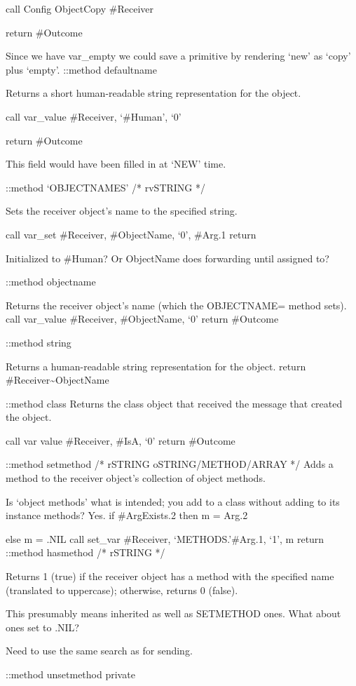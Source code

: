 call Config ObjectCopy \#Receiver

return \#Outcome

Since we have var\_empty we could save a primitive by rendering `new' as
`copy' plus `empty'. ::method defaultname

Returns a short human-readable string representation for the object.

call var\_value \#Receiver, `\#Human', `0'

return \#Outcome

This field would have been filled in at `NEW' time.

::method `OBJECTNAMES' /* rvSTRING */

Sets the receiver object's name to the specified string.

call var\_set \#Receiver, \#ObjectName, `0', \#Arg.1 return

Initialized to \#Human? Or ObjectName does forwarding until assigned to?

::method objectname

Returns the receiver object's name (which the OBJECTNAME= method sets).
call var\_value \#Receiver, \#ObjectName, `0' return \#Outcome

::method string

Returns a human-readable string representation for the object. return
\#Receiver\textasciitilde ObjectName

::method class Returns the class object that received the message that
created the object.

call var value \#Receiver, \#IsA, `0' return \#Outcome

::method setmethod /* rSTRING oSTRING/METHOD/ARRAY */ Adds a method to
the receiver object's collection of object methods.

Is `object methods' what is intended; you add to a class without adding
to its instance methods? Yes. if \#ArgExists.2 then m = Arg.2

else m = .NIL call set\_var \#Receiver, `METHODS.'\#Arg.1, `1', m return
::method hasmethod /* rSTRING */

Returns 1 (true) if the receiver object has a method with the specified
name (translated to uppercase); otherwise, returns 0 (false).

This presumably means inherited as well as SETMETHOD ones. What about
ones set to .NIL?

Need to use the same search as for sending.

::method unsetmethod private

